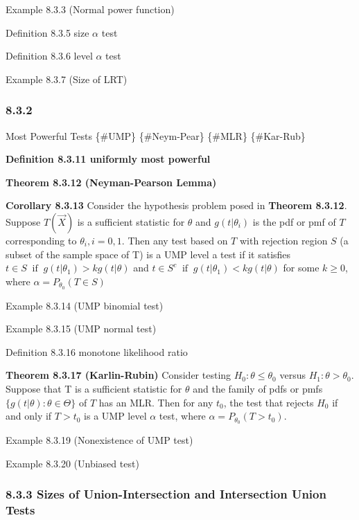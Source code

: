 \documentclass[10pt,twocolumn,portrait]{article}
\begin{document}
Example 8.3.3 (Normal power function)

Definition 8.3.5 size \(\alpha\) test

Definition 8.3.6 level \(\alpha\) test

Example 8.3.7 (Size of LRT)

\hypertarget{section-7}{%
\subsubsection{8.3.2}\label{section-7}}

Most Powerful Tests \{\#UMP\} \{\#Neym-Pear\} \{\#MLR\} \{\#Kar-Rub\}

\textbf{Definition 8.3.11 uniformly most powerful}

\textbf{Theorem 8.3.12 (Neyman-Pearson Lemma)}

\textbf{Corollary 8.3.13} Consider the hypothesis problem posed in
\textbf{Theorem 8.3.12}. Suppose \(T(\vec X)\) is a sufficient statistic
for \(\theta\) and \(g(t|\theta_i)\) is the pdf or pmf of \(T\)
corresponding to \(\theta_i,i=0,1\). Then any test based on \(T\) with
rejection region \(S\) (a subset of the sample space of T) is a UMP
level a test if it satisfies
\(t\in S\ \text{ if }\ g(t|\theta_1)>kg(t|\theta)\) and
\(t\in S^c\ \text{ if }\ g(t|\theta_1)<kg(t|\theta)\) for some
\(k\ge 0\), where \(\alpha=P_{\theta_0}(T\in S)\)

Example 8.3.14 (UMP binomial test)

Example 8.3.15 (UMP normal test)

Definition 8.3.16 monotone likelihood ratio

\textbf{Theorem 8.3.17 (Karlin-Rubin)} Consider testing
\(H_0:\theta\le\theta_0\) versus \(H_1:\theta>\theta_0\). Suppose that T
is a sufficient statistic for \(\theta\) and the family of pdfs or pmfs
\(\{g(t|\theta):\theta\in\Theta\}\) of \(T\) has an MLR. Then for any
\(t_0\), the test that rejects \(H_0\) if and only if \(T>t_0\) is a UMP
level \(\alpha\) test, where \(\alpha= P_{\theta_0}(T>t_0)\).

Example 8.3.19 (Nonexistence of UMP test)

Example 8.3.20 (Unbiased test)

\hypertarget{sizes-of-union-intersection-and-intersection-union-tests}{%
\subsubsection{8.3.3 Sizes of Union-Intersection and Intersection Union
Tests}\label{sizes-of-union-intersection-and-intersection-union-tests}}
\end{document}

